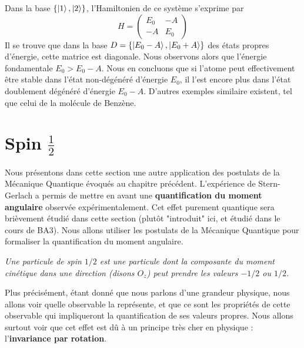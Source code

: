 \documentclass[../notesdecours.tex]{subfiles}
\begin{document}
Dans la base $\{\ket{1},\ket{2}\}$, l'Hamiltonien de ce système s'exprime par
\begin{equation}
    H = 
    \begin{pmatrix}
        E_0 & -A\\
        -A & E_0
    \end{pmatrix}
\end{equation}
Il se trouve que dans la base $D = \{\ket{E_0-A},\ket{E_0+A}\}$ des états propres d'énergie, cette matrice est diagonale. Nous observons alors que l'énergie fondamentale $E_0 > E_0-A$. Nous en concluons que si l'atome peut effectivement être stable dans l'état non-dégénéré d'énergie $E_0$, il l'est encore plus dans l'état doublement dégénéré d'énergie $E_0-A$. D'autres exemples similaire existent, tel que celui de la molécule de Benzène.



\section{Spin $\frac{1}{2}$}
Nous présentons dans cette section une autre application des postulats de la Mécanique Quantique évoqués au chapitre précédent. L'expérience de Stern-Gerlach a permis de mettre en avant une \textbf{quantification du moment angulaire} observée expérimentalement. Cet effet purement quantique sera brièvement étudié dans cette section (plutôt "introduit" ici, et étudié dans le cours de BA3). Nous allons utiliser les postulats de la Mécanique Quantique pour formaliser la quantification du moment angulaire. \\

\begin{leftbar}
    \textit{Une particule de spin $1/2$ est une particule dont la composante du moment cinétique dans une direction (disons $O_z$) peut prendre les valeurs $-1/2$ ou $1/2$. }
\end{leftbar}

Plus précisément, étant donné que nous parlons d'une grandeur physique, nous allons voir quelle observable la représente, et que ce sont les propriétés de cette observable qui impliqueront la quantification de ses valeurs propres. Nous allons surtout voir que cet effet est dû à un principe très cher en physique : l'\textbf{invariance par rotation}. \\
\end{document}
